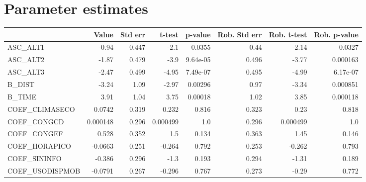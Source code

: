 \section{Parameter estimates}
\begin{tabular}{lrrrrrrr}
\toprule
{} &    Value &  Std err &   t-test &  p-value &  Rob. Std err &  Rob. t-test &  Rob. p-value \\
\midrule
ASC\_ALT1        &    -0.94 &    0.447 &     -2.1 &   0.0355 &          0.44 &        -2.14 &        0.0327 \\
ASC\_ALT2        &    -1.87 &    0.479 &     -3.9 & 9.64e-05 &         0.496 &        -3.77 &      0.000163 \\
ASC\_ALT3        &    -2.47 &    0.499 &    -4.95 & 7.49e-07 &         0.495 &        -4.99 &      6.17e-07 \\
B\_DIST          &    -3.24 &     1.09 &    -2.97 &  0.00296 &          0.97 &        -3.34 &      0.000851 \\
B\_TIME          &     3.91 &     1.04 &     3.75 &  0.00018 &          1.02 &         3.85 &      0.000118 \\
COEF\_CLIMASECO  &   0.0742 &    0.319 &    0.232 &    0.816 &         0.323 &         0.23 &         0.818 \\
COEF\_CONGCD     & 0.000148 &    0.296 & 0.000499 &      1.0 &         0.296 &     0.000499 &           1.0 \\
COEF\_CONGEF     &    0.528 &    0.352 &      1.5 &    0.134 &         0.363 &         1.45 &         0.146 \\
COEF\_HORAPICO   &  -0.0663 &    0.251 &   -0.264 &    0.792 &         0.253 &       -0.262 &         0.793 \\
COEF\_SININFO    &   -0.386 &    0.296 &     -1.3 &    0.193 &         0.294 &        -1.31 &         0.189 \\
COEF\_USODISPMOB &  -0.0791 &    0.267 &   -0.296 &    0.767 &         0.273 &        -0.29 &         0.772 \\
\bottomrule
\end{tabular}

